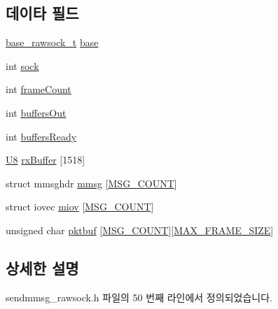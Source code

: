 \subsection*{데이타 필드}
\begin{DoxyCompactItemize}
\item 
\hyperlink{rawsock__impl_8h_ac539cdabcfe438f13001a289f222e6a2}{base\+\_\+rawsock\+\_\+t} \hyperlink{structsendmmsg__rawsock__t_a1507c5af4508d59cb0a730a852763e94}{base}
\item 
int \hyperlink{structsendmmsg__rawsock__t_a5903d0b282fc5eae503de618f896b5e1}{sock}
\item 
int \hyperlink{structsendmmsg__rawsock__t_abaf7d77bd2fc7eb6125fa605bd645b67}{frame\+Count}
\item 
int \hyperlink{structsendmmsg__rawsock__t_aeda5b51f8dc77d9f2012426b2e4d87aa}{buffers\+Out}
\item 
int \hyperlink{structsendmmsg__rawsock__t_a06dd59c797f7aa0ca9f888304888f2a0}{buffers\+Ready}
\item 
\hyperlink{openavb__types__base__pub_8h_aa63ef7b996d5487ce35a5a66601f3e73}{U8} \hyperlink{structsendmmsg__rawsock__t_a60a36f98faf9efc0f3447c6014c822ce}{rx\+Buffer} \mbox{[}1518\mbox{]}
\item 
struct mmsghdr \hyperlink{structsendmmsg__rawsock__t_a1ead7275d486440c363373a4eb650597}{mmsg} \mbox{[}\hyperlink{sendmmsg__rawsock_8h_ae6348da7257102c066e4718116ed4f4d}{M\+S\+G\+\_\+\+C\+O\+U\+NT}\mbox{]}
\item 
struct iovec \hyperlink{structsendmmsg__rawsock__t_af6a33764c240d3fc43bebf771c1d86f0}{miov} \mbox{[}\hyperlink{sendmmsg__rawsock_8h_ae6348da7257102c066e4718116ed4f4d}{M\+S\+G\+\_\+\+C\+O\+U\+NT}\mbox{]}
\item 
unsigned char \hyperlink{structsendmmsg__rawsock__t_af18aae0e23cde1425d996e84b62c8829}{pktbuf} \mbox{[}\hyperlink{sendmmsg__rawsock_8h_ae6348da7257102c066e4718116ed4f4d}{M\+S\+G\+\_\+\+C\+O\+U\+NT}\mbox{]}\mbox{[}\hyperlink{sendmmsg__rawsock_8h_ad15d35a0d29a9dbf9324e3859ce3b008}{M\+A\+X\+\_\+\+F\+R\+A\+M\+E\+\_\+\+S\+I\+ZE}\mbox{]}
\end{DoxyCompactItemize}


\subsection{상세한 설명}


sendmmsg\+\_\+rawsock.\+h 파일의 50 번째 라인에서 정의되었습니다.




